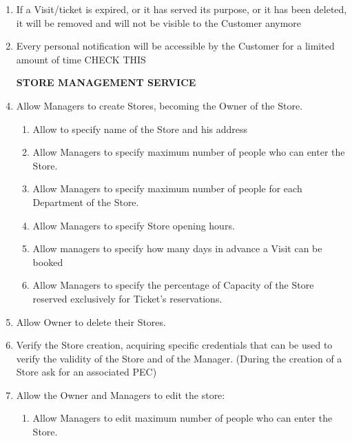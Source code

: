 \documentclass[a4paper, 10pt, oneside]{article}
\newcommand*{\lorenzo}[1]{\textcolor{BurntOrange}{#1}}
\begin{document}
\begin{enumerate}[align=left]
    \item \label{req:expiredTickOrVis} If a Visit/ticket is expired, or it has served its purpose, or it has been deleted, it will be removed and will not be visible to the Customer anymore 

    \item \label{req:accessNotification} Every personal notification will be accessible by the Customer for a limited amount of time \lorenzo{CHECK THIS}
    
    \item[\textbf{STORE MANAGEMENT SERVICE}]
    \item \label{req:man:createStore}Allow Managers to create Stores, becoming the Owner of the Store.
    \begin{enumerate}[label={-}]
        \item \label{req:man:createStore:nameAndLoc}Allow to specify name of the Store and his address
         \item \label{req:man:createStore:maxPeople}Allow Managers to specify maximum number of people who can enter the Store.
        \item \label{req:man:createStore:maxPeoplePerDep}Allow Managers to specify maximum number of people for each Department of the Store.
        \item \label{req:man:createStore:openingHours}Allow Managers to specify Store opening hours.
        \item \label{req:man:createStore:daysToBook}Allow managers to specify how many days in advance a Visit can be booked
        \item \label{req:man:createStore:percentageTicket} Allow Managers to specify the percentage of Capacity of the Store reserved exclusively for Ticket's reservations.
    \end{enumerate}
    \item \label{req:man:deleteStore}Allow Owner to delete their Stores.
    \item \label{req:man:verifyOwnerCred}Verify the Store creation, acquiring specific credentials that can be used to verify the validity of the Store and of the Manager. \lorenzo{(During the creation of a Store ask for an associated PEC)}
    \item \label{req:man:updateStoreInfo}Allow the Owner and Managers to edit the store:
    \begin{enumerate}[label={-}]
         \item \label{req:man:updateStoreInfo:maxPeople}Allow Managers to edit maximum number of people who can enter the Store.

\end{enumerate}
\end{enumerate}
\end{document}
